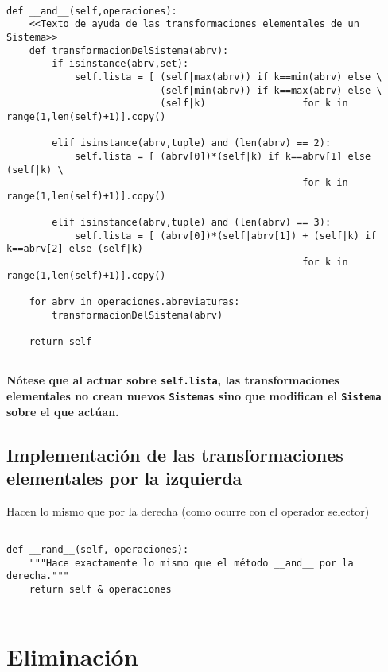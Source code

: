 \documentclass[11pt]{report}
\begin{document}
\begin{verbatim}

def __and__(self,operaciones):
    <<Texto de ayuda de las transformaciones elementales de un Sistema>>
    def transformacionDelSistema(abrv):
        if isinstance(abrv,set):
            self.lista = [ (self|max(abrv)) if k==min(abrv) else \
                           (self|min(abrv)) if k==max(abrv) else \
                           (self|k)                 for k in range(1,len(self)+1)].copy()
            
        elif isinstance(abrv,tuple) and (len(abrv) == 2):
            self.lista = [ (abrv[0])*(self|k) if k==abrv[1] else (self|k) \
                                                    for k in range(1,len(self)+1)].copy()

        elif isinstance(abrv,tuple) and (len(abrv) == 3):
            self.lista = [ (abrv[0])*(self|abrv[1]) + (self|k) if k==abrv[2] else (self|k)
                                                    for k in range(1,len(self)+1)].copy()

    for abrv in operaciones.abreviaturas:
        transformacionDelSistema(abrv)

    return self
        
\end{verbatim}

\textbf{Nótese que al actuar sobre \texttt{self.lista}, las transformaciones elementales no crean nuevos 
\texttt{Sistemas} sino que modifican el \texttt{Sistema} sobre el que actúan.}

\subsection{Implementación de las transformaciones elementales por la izquierda}
\label{sec:orgde67f1c}

Hacen lo mismo que por la derecha (como ocurre con el operador selector)

\begin{verbatim}
        
def __rand__(self, operaciones):
    """Hace exactamente lo mismo que el método __and__ por la derecha."""
    return self & operaciones
    
\end{verbatim}

\section{Eliminación}
\label{sec:orgf3030db}
\end{document}
